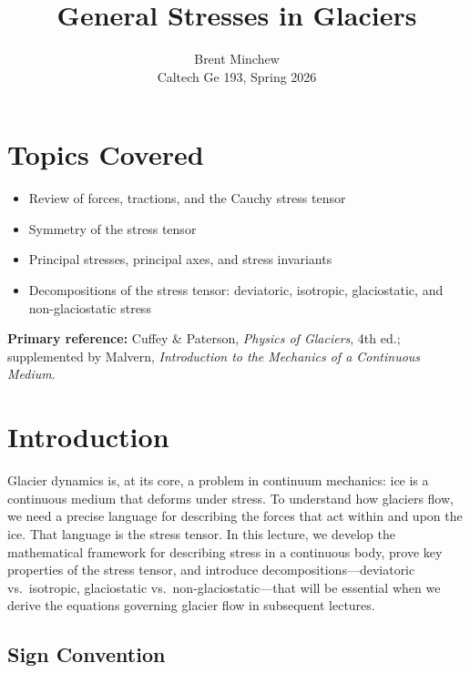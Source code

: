 \documentclass[11pt]{article}
\title{General Stresses in Glaciers}
\author{Brent Minchew \\Caltech Ge 193, Spring 2026}
\date{}
\begin{document}
\maketitle

\section*{Topics Covered}

\begin{itemize}
  \item Review of forces, tractions, and the Cauchy stress tensor
  \item Symmetry of the stress tensor
  \item Principal stresses, principal axes, and stress invariants
  \item Decompositions of the stress tensor: deviatoric, isotropic, glaciostatic, and non-glaciostatic stress
\end{itemize}

\bigskip
\noindent \textbf{Primary reference:} Cuffey \& Paterson, \textit{Physics of Glaciers}, 4th ed.; supplemented by Malvern, \textit{Introduction to the Mechanics of a Continuous Medium}.

\section{Introduction}

Glacier dynamics is, at its core, a problem in continuum mechanics: ice is a continuous medium that deforms under stress.  To understand how glaciers flow, we need a precise language for describing the forces that act within and upon the ice.  That language is the stress tensor.  In this lecture, we develop the mathematical framework for describing stress in a continuous body, prove key properties of the stress tensor, and introduce decompositions---deviatoric vs.\ isotropic, glaciostatic vs.\ non-glaciostatic---that will be essential when we derive the equations governing glacier flow in subsequent lectures.

\subsection*{Sign Convention}
\end{document}
